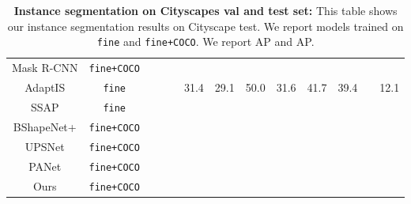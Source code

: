 \documentclass[10pt,twocolumn,letterpaper]{article}
\begin{document}
\begin{table*}[t!]
\begin{tabular}{|c|c|c|cc|cccccccc|}
  Mask R-CNN \cite{mask-rcnn}  & \texttt{fine+COCO} & & & & & & & & & & & \\
   AdaptIS  \cite{Sofiiuk2019AdaptISAI}  & \texttt{fine} &  & & & 31.4 &29.1 &50.0 &31.6 &41.7&39.4 & &12.1 \\
  SSAP \cite{Gao_2019_ICCV}  & \texttt{fine} & & & 
    & & & & & & & & \\
  BShapeNet+ \cite{bshapenet} & \texttt{fine+COCO} &  & & 
    & & & & & & & & \\
UPSNet \cite{upsnet} & \texttt{fine+COCO} & & & & & & & & & & & \\
  PANet \cite{panet} & \texttt{fine+COCO} & & & 
    & & & & & & & & \\
 
Ours & \texttt{fine+COCO} & &  &  &  &  &  &  &  &  &  & \\
  \hline 
    
    
  \end{tabular}\\
  \caption{\textbf{Instance segmentation on Cityscapes val and test set:} This table shows our instance segmentation results on Cityscape test. We report models trained on \texttt{fine} and \texttt{fine+COCO}. We report AP and AP.}
  \label{tab:inst-test-results}
  \vspace{-1mm}
\end{table*}
\end{document}

